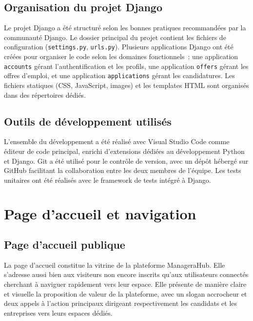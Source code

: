 \documentclass[12pt,a4paper]{report}
\begin{document}
\subsection{Organisation du projet Django}

Le projet Django a été structuré selon les bonnes pratiques recommandées par la communauté Django. Le dossier principal du projet contient les fichiers de configuration (\texttt{settings.py}, \texttt{urls.py}). Plusieurs applications Django ont été créées pour organiser le code selon les domaines fonctionnels~: une application \texttt{accounts} gérant l'authentification et les profils, une application \texttt{offers} gérant les offres d'emploi, et une application \texttt{applications} gérant les candidatures. Les fichiers statiques (CSS, JavaScript, images) et les templates HTML sont organisés dans des répertoires dédiés.

\subsection{Outils de développement utilisés}

L'ensemble du développement a été réalisé avec Visual Studio Code comme éditeur de code principal, enrichi d'extensions dédiées au développement Python et Django. Git a été utilisé pour le contrôle de version, avec un dépôt hébergé sur GitHub facilitant la collaboration entre les deux membres de l'équipe. Les tests unitaires ont été réalisés avec le framework de tests intégré à Django.

\section{Page d'accueil et navigation}

\subsection{Page d'accueil publique}

La page d'accueil constitue la vitrine de la plateforme ManageraHub. Elle s'adresse aussi bien aux visiteurs non encore inscrits qu'aux utilisateurs connectés cherchant à naviguer rapidement vers leur espace. Elle présente de manière claire et visuelle la proposition de valeur de la plateforme, avec un slogan accrocheur et deux appels à l'action principaux dirigeant respectivement les candidats et les entreprises vers leurs espaces dédiés.
\end{document}
